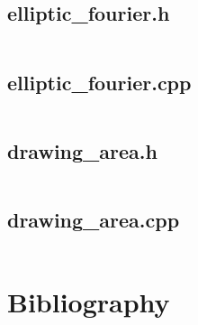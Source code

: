 \documentclass[12pt,english]{article}
\begin{document}
\subsection*{elliptic\_fourier.h}
\inputminted[breakanywhere=true]{cpp}{../code/elliptic_fourier/elliptic_fourier.h}
\subsection*{elliptic\_fourier.cpp}
\inputminted[breakanywhere=true]{cpp}{../code/elliptic_fourier/elliptic_fourier.cpp}
\subsection*{drawing\_area.h}
\inputminted[breakanywhere=true]{cpp}{../code/elliptic_fourier/drawing_area.h}
\subsection*{drawing\_area.cpp}
\inputminted[breakanywhere=true]{cpp}{../code/elliptic_fourier/drawing_area.cpp}

\section{Bibliography}


\end{document}
